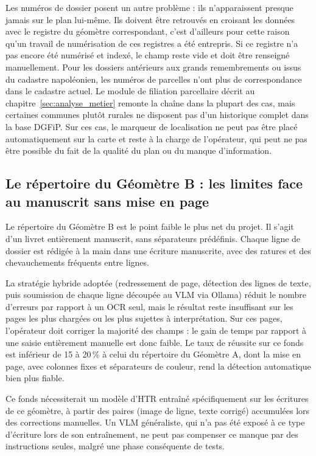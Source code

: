 Les numéros de dossier posent un autre problème : ils n'apparaissent presque jamais sur le plan lui-même. Ils doivent être retrouvés en croisant les données avec le registre du géomètre correspondant, c'est d'ailleurs pour cette raison qu'un travail de numérisation de ces registres a été entrepris. Si ce registre n'a pas encore été numérisé et indexé, le champ reste vide et doit être renseigné manuellement. Pour les dossiers antérieurs aux grands remembrements ou issus du cadastre napoléonien, les numéros de parcelles n'ont plus de correspondance dans le cadastre actuel. Le module de filiation parcellaire décrit au chapitre~\ref{sec:analyse_metier} remonte la chaîne dans la plupart des cas, mais certaines communes plutôt rurales ne disposent pas d'un historique complet dans la base DGFiP. Sur ces cas, le marqueur de localisation ne peut pas être placé automatiquement sur la carte et reste à la charge de l'opérateur, qui peut ne pas être possible du fait de la qualité du plan ou du manque d'information.


\subsection{Le répertoire du Géomètre B : les limites face au manuscrit sans mise en page}

Le répertoire du Géomètre B est le point faible le plus net du projet. Il s'agit d'un livret entièrement manuscrit, sans séparateurs prédéfinis. Chaque ligne de dossier est rédigée à la main dans une écriture manuscrite, avec des ratures et des chevauchements fréquents entre lignes.

La stratégie hybride adoptée (redressement de page, détection des lignes de texte, puis soumission de chaque ligne découpée au VLM via Ollama) réduit le nombre d'erreurs par rapport à un OCR seul, mais le résultat reste insuffisant sur les pages les plus chargées ou les plus sujettes à interprétation. Sur ces pages, l'opérateur doit corriger la majorité des champs : le gain de temps par rapport à une saisie entièrement manuelle est donc faible. Le taux de réussite sur ce fonds est inférieur de 15 à 20\,\% à celui du répertoire du Géomètre A, dont la mise en page, avec colonnes fixes et séparateurs de couleur, rend la détection automatique bien plus fiable.

Ce fonds nécessiterait un modèle d'HTR entraîné spécifiquement sur les écritures de ce géomètre, à partir des paires (image de ligne, texte corrigé) accumulées lors des corrections manuelles. Un VLM généraliste, qui n'a pas été exposé à ce type d'écriture lors de son entraînement, ne peut pas compenser ce manque par des instructions seules, malgré une phase conséquente de tests.


